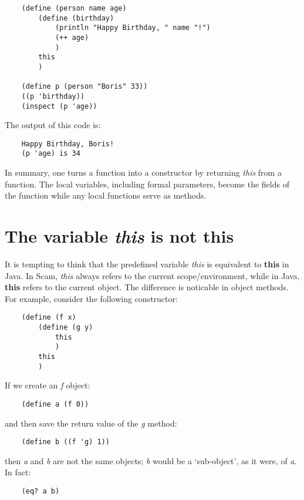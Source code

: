 \begin{verbatim}
    (define (person name age)
        (define (birthday)
            (println "Happy Birthday, " name "!")
            (++ age)
            )
        this
        )
        
    (define p (person "Boris" 33))
    ((p 'birthday))
    (inspect (p 'age))
\end{verbatim}

The output of this code is:

\begin{verbatim}
    Happy Birthday, Boris!
    (p 'age) is 34
\end{verbatim}

In summary, one turns a function into a constructor by returning
{\it this}
from a function. The local variables, including
formal parameters, become the fields of the function while
any local functions serve as methods.

\section{The variable {\it this} is not {\bf this}}

It is tempting to think that the predefined variable {\it this} is
equivalent to {\bf this} in Java.
In Scam, {\it this} always refers to the current scope/environment,
while in Java, {\bf this} refers to the current object. The difference
is noticable in object methods. For example, consider the following
constructor:

\begin{verbatim}
    (define (f x)
        (define (g y)
            this
            )
        this
        )
\end{verbatim}

If we create an {\it f} object:

\begin{verbatim}
    (define a (f 0))
\end{verbatim}

and then save the return value of the {\it g} method:

\begin{verbatim}
    (define b ((f 'g) 1))
\end{verbatim}
    
then {\it a} and {\it b} are not the same objects; {\it b} would
be a `sub-object', as it were, of {\it a}. In fact:

\begin{verbatim}
    (eq? a b)
\end{verbatim}

